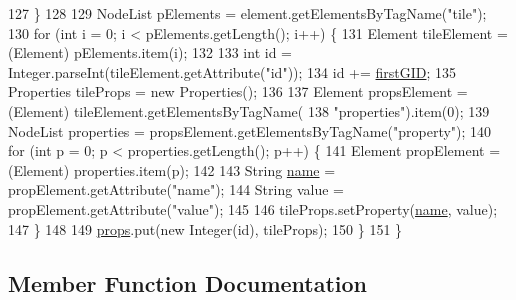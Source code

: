 \begin{DoxyCode}
127         \}
128 
129         NodeList pElements = element.getElementsByTagName(\textcolor{stringliteral}{"tile"});
130         \textcolor{keywordflow}{for} (\textcolor{keywordtype}{int} i = 0; i < pElements.getLength(); i++) \{
131             Element tileElement = (Element) pElements.item(i);
132 
133             \textcolor{keywordtype}{int} \textcolor{keywordtype}{id} = Integer.parseInt(tileElement.getAttribute(\textcolor{stringliteral}{"id"}));
134             \textcolor{keywordtype}{id} += \mbox{\hyperlink{classorg_1_1newdawn_1_1slick_1_1tiled_1_1_tile_set_a7c27767efccd6a3a68dfa519251fbec1}{firstGID}};
135             Properties tileProps = \textcolor{keyword}{new} Properties();
136 
137             Element propsElement = (Element) tileElement.getElementsByTagName(
138                     \textcolor{stringliteral}{"properties"}).item(0);
139             NodeList properties = propsElement.getElementsByTagName(\textcolor{stringliteral}{"property"});
140             \textcolor{keywordflow}{for} (\textcolor{keywordtype}{int} p = 0; p < properties.getLength(); p++) \{
141                 Element propElement = (Element) properties.item(p);
142 
143                 String \mbox{\hyperlink{classorg_1_1newdawn_1_1slick_1_1tiled_1_1_tile_set_ac0de29bb9eb37a2c57db969aab877e49}{name}} = propElement.getAttribute(\textcolor{stringliteral}{"name"});
144                 String value = propElement.getAttribute(\textcolor{stringliteral}{"value"});
145 
146                 tileProps.setProperty(\mbox{\hyperlink{classorg_1_1newdawn_1_1slick_1_1tiled_1_1_tile_set_ac0de29bb9eb37a2c57db969aab877e49}{name}}, value);
147             \}
148 
149             \mbox{\hyperlink{classorg_1_1newdawn_1_1slick_1_1tiled_1_1_tile_set_ada3988681e613aa9884649c19509d29c}{props}}.put(\textcolor{keyword}{new} Integer(\textcolor{keywordtype}{id}), tileProps);
150         \}
151     \}
\end{DoxyCode}


\subsection{Member Function Documentation}
\mbox{\label{classorg_1_1newdawn_1_1slick_1_1tiled_1_1_tile_set_a1c79857700ca40c4e66034db53c90bed}} 

